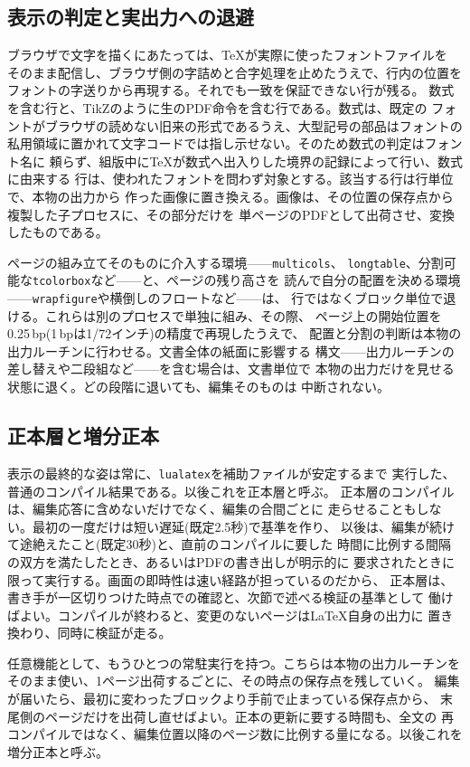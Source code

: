 \documentclass[a4paper,11pt]{ltjsarticle}
\newcommand{\code}[1]{\texttt{#1}}
\begin{document}
\subsection{表示の判定と実出力への退避}

ブラウザで文字を描くにあたっては、\TeX{}が実際に使ったフォントファイルを
そのまま配信し、ブラウザ側の字詰めと合字処理を止めたうえで、行内の位置を
フォントの字送りから再現する。それでも一致を保証できない行が残る。
数式を含む行と、TikZのように生のPDF命令を含む行である。数式は、既定の
フォントがブラウザの読めない旧来の形式であるうえ、大型記号の部品はフォントの
私用領域に置かれて文字コードでは指し示せない。そのため数式の判定はフォント名に
頼らず、組版中に\TeX{}が数式へ出入りした境界の記録によって行い、数式に由来する
行は、使われたフォントを問わず対象とする。該当する行は行単位で、本物の出力から
作った画像に置き換える。画像は、その位置の保存点から複製した子プロセスに、その部分だけを
単ページのPDFとして出荷させ、変換したものである。

ページの組み立てそのものに介入する環境——\code{multicols}、
\code{longtable}、分割可能な\code{tcolorbox}など——と、ページの残り高さを
読んで自分の配置を決める環境——\code{wrapfigure}や横倒しのフロートなど——は、
行ではなくブロック単位で退ける。これらは別のプロセスで単独に組み、その際、
ページ上の開始位置を0.25\,bp(1\,bpは1/72インチ)の精度で再現したうえで、
配置と分割の判断は本物の出力ルーチンに行わせる。文書全体の紙面に影響する
構文——出力ルーチンの差し替えや二段組など——を含む場合は、文書単位で
本物の出力だけを見せる状態に退く。どの段階に退いても、編集そのものは
中断されない。

\subsection{正本層と増分正本}

表示の最終的な姿は常に、\code{lualatex}を補助ファイルが安定するまで
実行した、普通のコンパイル結果である。以後これを正本層と呼ぶ。
正本層のコンパイルは、編集応答に含めないだけでなく、編集の合間ごとに
走らせることもしない。最初の一度だけは短い遅延(既定2.5秒)で基準を作り、
以後は、編集が続けて途絶えたこと(既定30秒)と、直前のコンパイルに要した
時間に比例する間隔の双方を満たしたとき、あるいはPDFの書き出しが明示的に
要求されたときに限って実行する。画面の即時性は速い経路が担っているのだから、
正本層は、書き手が一区切りつけた時点での確認と、次節で述べる検証の基準として
働けばよい。コンパイルが終わると、変更のないページは\LaTeX{}自身の出力に
置き換わり、同時に検証が走る。

任意機能として、もうひとつの常駐実行を持つ。こちらは本物の出力ルーチンを
そのまま使い、1ページ出荷するごとに、その時点の保存点を残していく。
編集が届いたら、最初に変わったブロックより手前で止まっている保存点から、
末尾側のページだけを出荷し直せばよい。正本の更新に要する時間も、全文の
再コンパイルではなく、編集位置以降のページ数に比例する量になる。以後これを
増分正本と呼ぶ。
\end{document}
